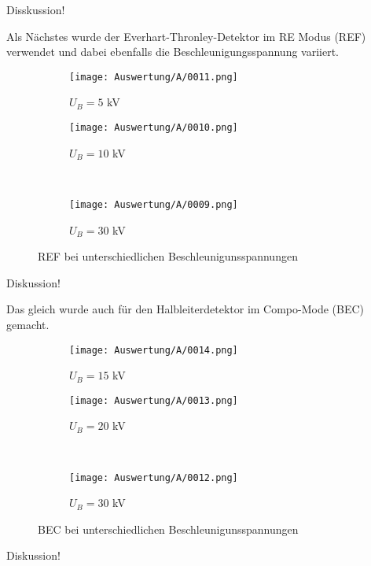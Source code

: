Disskussion!

\newpage
Als Nächstes wurde der Everhart-Thronley-Detektor im RE Modus (REF) verwendet und dabei ebenfalls die Beschleunigungsspannung variiert.
\begin{figure}[h]
    \centering
    
    \begin{subfigure}[b]{0.45\textwidth}
        \centering
        \texttt{[image: Auswertung/A/0011.png]}
        \caption{$U_B = 5$ kV}
    \end{subfigure}
    \hfill
    \begin{subfigure}[b]{0.45\textwidth}
        \centering
        \texttt{[image: Auswertung/A/0010.png]}
        \caption{$U_B = 10$ kV}
    \end{subfigure}
    \\
    \begin{subfigure}[b]{0.45\textwidth}
        \centering
        \texttt{[image: Auswertung/A/0009.png]}
        \caption{$U_B = 30$ kV}
    \end{subfigure}
    \caption{REF bei unterschiedlichen Beschleunigunsspannungen}
\end{figure}

Diskussion!

\newpage
Das gleich wurde auch für den Halbleiterdetektor im Compo-Mode (BEC) gemacht.
\begin{figure}[h]
    \centering
    
    \begin{subfigure}[b]{0.45\textwidth}
        \centering
        \texttt{[image: Auswertung/A/0014.png]}
        \caption{$U_B = 15$ kV}
    \end{subfigure}
    \hfill
    \begin{subfigure}[b]{0.45\textwidth}
        \centering
        \texttt{[image: Auswertung/A/0013.png]}
        \caption{$U_B = 20$ kV}
    \end{subfigure}
    \\
    \begin{subfigure}[b]{0.45\textwidth}
        \centering
        \texttt{[image: Auswertung/A/0012.png]}
        \caption{$U_B = 30$ kV}
    \end{subfigure}
    \caption{BEC bei unterschiedlichen Beschleunigunsspannungen}
\end{figure}

Diskussion!

